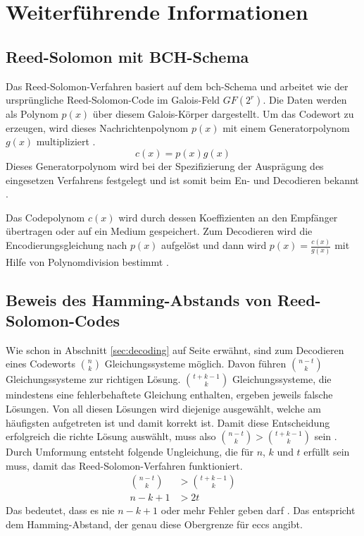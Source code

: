 \chapter{Weiterführende Informationen}\label{app:supplemental-information}

\section{Reed-Solomon mit BCH-Schema}\label{app:bch-rs}

Das Reed-Solomon-Verfahren basiert auf dem \acrfull{bch}-Schema und arbeitet wie der ursprüngliche Reed-Solomon-Code im Galois-Feld $GF(2^r)$.
Die Daten werden als Polynom $p(x)$ über diesem Galois-Körper dargestellt. 
Um das Codewort zu erzeugen, wird dieses Nachrichtenpolynom $p(x)$ mit einem Generatorpolynom $g(x)$ multipliziert \cite{stoneMultipleBurstErrorCorrection1963}.
\[
c(x)=p(x)g(x)
\]
Dieses Generatorpolynom wird bei der Spezifizierung der Ausprägung des eingesetzen Verfahrens festgelegt und ist somit beim En- und Decodieren bekannt \cite{deepak2018WhatReedSolomon2022}.

Das Codepolynom $c(x)$ wird durch dessen Koeffizienten an den Empfänger übertragen oder auf ein Medium gespeichert.
Zum Decodieren wird die Encodierungsgleichung nach $p(x)$ aufgelöst und dann wird $p(x)=\frac{c(x)}{g(x)}$ mit Hilfe von Polynomdivision bestimmt \cite[Kapitel 1.4]{geiselTutorialReedSolomonError1990}.

\section{Beweis des Hamming-Abstands von Reed-Solomon-Codes}\label{app:hammingDistanceRS}

Wie schon in Abschnitt \ref{sec:decoding} auf Seite \pageref{sec:decoding} erwähnt, sind zum Decodieren eines Codeworts $\binom{n}{k}$ Gleichungssysteme möglich.
Davon führen $\binom{n-t}{k}$ Gleichungssysteme zur richtigen Lösung.
$\binom{t+k-1}{k}$ Gleichungssysteme, die mindestens eine fehlerbehaftete Gleichung enthalten, ergeben jeweils falsche Lösungen.
Von all diesen Lösungen wird diejenige ausgewählt, welche am häufigsten aufgetreten ist und damit korrekt ist.
Damit diese Entscheidung erfolgreich die richte Lösung auswählt, muss also $\binom{n-t}{k} > \binom{t+k-1}{k}$ sein \cite{reedPolynomialCodesCertain1960}.
Durch Umformung entsteht folgende Ungleichung, die für $n$, $k$ und $t$ erfüllt sein muss, damit das Reed-Solomon-Verfahren funktioniert.
\begin{align}
\binom{n-t}{k} &> \binom{t+k-1}{k} \nonumber\\
n-k+1 &> 2t \nonumber
\end{align}
Das bedeutet, dass es nie $n-k+1$ oder mehr Fehler geben darf \cite{reedPolynomialCodesCertain1960}.
Das entspricht dem Hamming-Abstand, der genau diese Obergrenze für \acrshort{ecc}s angibt.

